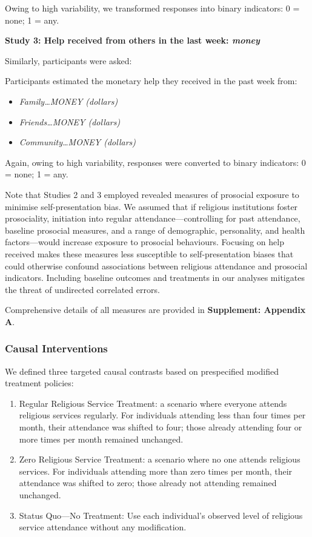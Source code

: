 \documentclass[
  single column]{article}
\providecommand{\tightlist}{%
  \setlength{\itemsep}{0pt}\setlength{\parskip}{0pt}}\usepackage{longtable,booktabs,array}
\begin{document}
Owing to high variability, we transformed responses into binary
indicators: 0 = none; 1 = any.

\textbf{Study 3: Help received from others in the last week:
\emph{money} }

Similarly, participants were asked:

Participants estimated the monetary help they received in the past week
from:

\begin{itemize}
\tightlist
\item
  \emph{Family\ldots MONEY (dollars)}
\item
  \emph{Friends\ldots MONEY (dollars)}
\item
  \emph{Community\ldots MONEY (dollars)}
\end{itemize}

Again, owing to high variability, responses were converted to binary
indicators: 0 = none; 1 = any.

Note that Studies 2 and 3 employed revealed measures of prosocial
exposure to minimise self-presentation bias. We assumed that if
religious institutions foster prosociality, initiation into regular
attendance---controlling for past attendance, baseline prosocial
measures, and a range of demographic, personality, and health
factors---would increase exposure to prosocial behaviours. Focusing on
help received makes these measures less susceptible to self-presentation
biases that could otherwise confound associations between religious
attendance and prosocial indicators. Including baseline outcomes and
treatments in our analyses mitigates the threat of undirected correlated
errors.

Comprehensive details of all measures are provided in
\textbf{Supplement: Appendix A}.

\subsubsection{Causal Interventions}\label{causal-interventions}

We defined three targeted causal contrasts based on prespecified
modified treatment policies:

\begin{enumerate}
\def\labelenumi{\arabic{enumi}.}
\tightlist
\item
  Regular Religious Service Treatment: a scenario where everyone attends
  religious services regularly. For individuals attending less than four
  times per month, their attendance was shifted to four; those already
  attending four or more times per month remained unchanged.
\item
  Zero Religious Service Treatment: a scenario where no one attends
  religious services. For individuals attending more than zero times per
  month, their attendance was shifted to zero; those already not
  attending remained unchanged.
\item
  Status Quo---No Treatment: Use each individual's observed level of
  religious service attendance without any modification.
\end{enumerate}
\end{document}
